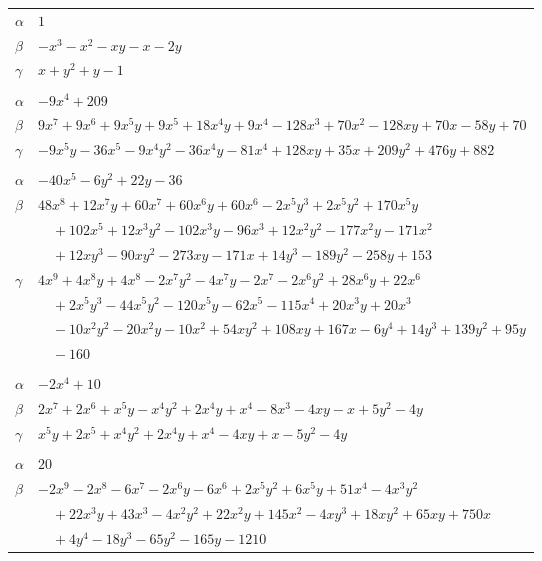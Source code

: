 \documentclass[11pt]{article}
\begin{document}
\begin{longtable}{@{}ll@{}}
$\alpha$ & $1$\\
$\beta$ & $-x^{3}-x^{2}-xy-x-2y$\\
$\gamma$ & $x+y^{2}+y-1$\\
\addlinespace[3pt]
\multicolumn{2}{@{}l}{$\{i,j\}=\{0,11\}$, $k_{ij}=2^{3}\cdot 5^{2}\cdot 13$}\\
$\alpha$ & $-9x^{4}+209$\\
$\beta$ & $9x^{7}+9x^{6}+9x^{5}y+9x^{5}+18x^{4}y+9x^{4}-128x^{3}+70x^{2}-128xy+70x-58y+70$\\
$\gamma$ & $-9x^{5}y-36x^{5}-9x^{4}y^{2}-36x^{4}y-81x^{4}+128xy+35x+209y^{2}+476y+882$\\
\addlinespace[3pt]
\multicolumn{2}{@{}l}{$\{i,j\}=\{0,13\}$, $k_{ij}=2^{4}$}\\
$\alpha$ & $-40x^{5}-6y^{2}+22y-36$\\
$\beta$ & $48x^{8}+12x^{7}y+60x^{7}+60x^{6}y+60x^{6}-2x^{5}y^{3}+2x^{5}y^{2}+170x^{5}y$\\
 & $\quad +102x^{5}+12x^{3}y^{2}-102x^{3}y-96x^{3}+12x^{2}y^{2}-177x^{2}y-171x^{2}$\\
 & $\quad +12xy^{3}-90xy^{2}-273xy-171x+14y^{3}-189y^{2}-258y+153$\\
$\gamma$ & $4x^{9}+4x^{8}y+4x^{8}-2x^{7}y^{2}-4x^{7}y-2x^{7}-2x^{6}y^{2}+28x^{6}y+22x^{6}$\\
 & $\quad +2x^{5}y^{3}-44x^{5}y^{2}-120x^{5}y-62x^{5}-115x^{4}+20x^{3}y+20x^{3}$\\
 & $\quad -10x^{2}y^{2}-20x^{2}y-10x^{2}+54xy^{2}+108xy+167x-6y^{4}+14y^{3}+139y^{2}+95y$\\
 & $\quad -160$\\
\addlinespace[3pt]
\multicolumn{2}{@{}l}{$\{i,j\}=\{0,20\}$, $k_{ij}=2^{3}\cdot 5$}\\
$\alpha$ & $-2x^{4}+10$\\
$\beta$ & $2x^{7}+2x^{6}+x^{5}y-x^{4}y^{2}+2x^{4}y+x^{4}-8x^{3}-4xy-x+5y^{2}-4y$\\
$\gamma$ & $x^{5}y+2x^{5}+x^{4}y^{2}+2x^{4}y+x^{4}-4xy+x-5y^{2}-4y$\\
\addlinespace[3pt]
\multicolumn{2}{@{}l}{$\{i,j\}=\{0,31\}$, $k_{ij}=2^{5}\cdot 5^{3}$}\\
$\alpha$ & $20$\\
$\beta$ & $-2x^{9}-2x^{8}-6x^{7}-2x^{6}y-6x^{6}+2x^{5}y^{2}+6x^{5}y+51x^{4}-4x^{3}y^{2}$\\
 & $\quad +22x^{3}y+43x^{3}-4x^{2}y^{2}+22x^{2}y+145x^{2}-4xy^{3}+18xy^{2}+65xy+750x$\\
 & $\quad +4y^{4}-18y^{3}-65y^{2}-165y-1210$\\

\end{longtable}
\end{document}

